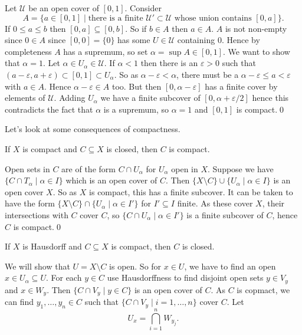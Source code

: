 \documentclass{article}
\begin{document}
\pf Let $ \mathcal U $ be an open cover of $ [0,1] $. Consider
\[
	A = \{a\in [0,1] \mid \text{there is a finite } \mathcal U' \subset \mathcal U \text{ whose union contains } [0,a]\}.
\]
If $ 0\le a \le b $ then $ [0,a]\subseteq [0,b] $. So if $ b\in A $ then $ a\in A $. $ A $ is not non-empty since $ 0\in A $ since $ [0,0]=\{0\} $ has some $ U\in \mathcal U $ containing $ 0 $. Hence by completeness $ A $ has a supremum, so set $ \alpha =\sup A \in [0,1] $. We want to show that $ \alpha = 1 $. Let $ \alpha \in U_\alpha \in \mathcal U $. If $ \alpha<1 $ then there is an $ \varepsilon >0 $ such that $ (a-\varepsilon, a+\varepsilon)\subset [0,1] \subset U_\alpha$. So as $ \alpha-\varepsilon< \alpha $, there must be a $ \alpha-\varepsilon\le a <\varepsilon $ with $ a\in A $. Hence $ \alpha-\varepsilon \in A $ too. But then $ [0,\alpha-\varepsilon] $ has a finite cover by elements of $ \mathcal U $. Adding $ U_\alpha $ we have a finite subcover of $ [0,\alpha+\varepsilon/2] $ hence this contradicts the fact that $ \alpha $ is a supremum, so $ \alpha=1 $ and $ [0,1] $ is compact.\qed
\par
Let's look at some consequences of compactness.
\begin{proposition}
  If $ X $ is compact and $ C\subseteq X $ is closed, then $ C $ is compact.
\end{proposition}
\pf Open sets in $ C $ are of the form $ C\cap U_\alpha $ for $ U_\alpha $ open in $ X $. Suppose we have $ \{C\cap T_\alpha \mid \alpha \in I\} $ which is an open cover of $ C $. Then $ \{X\setminus C\} \cup \{U_\alpha \mid \alpha \in I\} $ is an open cover $ X $. So as $ X $ is compact, this has a finite subcover. It can be taken to have the form $ \{X\setminus C\} \cap \{U_\alpha \mid \alpha\in I'\} $ for $ I'\subseteq I $ finite. As these cover $ X $, their intersections with $ C $ cover $ C $, so $ \{C\cap U_\alpha\mid \alpha\in I'\} $ is a finite subcover of $ C $, hence $ C $ is compact.\qed
\begin{proposition}
  If $ X $ is Hausdorff and $ C \subseteq X $ is compact, then $ C $ is closed.
\end{proposition} 
\pf We will show that $ U=X\setminus C $ is open. So for $ x\in U $, we have to find an open $ x\in U_\alpha\subseteq U $. For each $ y\in C $ use Hausdorffness to find disjoint open sets $ y\in V_y $ and $ x\in W_y $. Then $ \{C\cap V_y\mid y \in C\} $ is an open cover of $ C $. As $ C $ is copmact, we can find $ y_1,\dots, y_n\in C $ such that $ \{ C\cap V_y\mid  i=1,\dots, n\}$ cover $ C $. Let
\[
	U_x = \bigcap_{i=1}^n W_{y_j}.
\]
\end{document}
